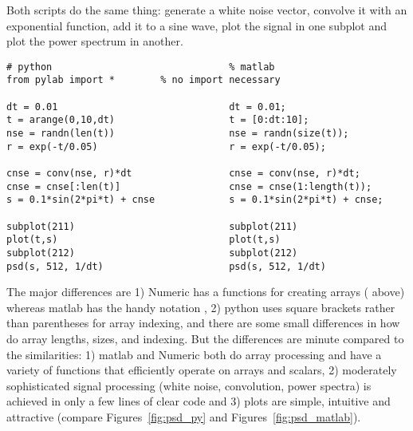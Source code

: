 \documentclass[twoside]{book}
\begin{document}

Both scripts do the same thing: generate a white noise vector,
convolve it with an exponential function, add it to a sine wave, plot
the signal in one subplot and plot the power spectrum in another.

\begin{lstlisting}[caption={matplotlib and matlab}, label=lst:versus_matlab]
# python                               % matlab
from pylab import *        % no import necessary

dt = 0.01                              dt = 0.01;
t = arange(0,10,dt)                    t = [0:dt:10];
nse = randn(len(t))                    nse = randn(size(t));
r = exp(-t/0.05)                       r = exp(-t/0.05);

cnse = conv(nse, r)*dt                 cnse = conv(nse, r)*dt;
cnse = cnse[:len(t)]                   cnse = cnse(1:length(t));
s = 0.1*sin(2*pi*t) + cnse             s = 0.1*sin(2*pi*t) + cnse;

subplot(211)                           subplot(211)
plot(t,s)                              plot(t,s)
subplot(212)                           subplot(212)
psd(s, 512, 1/dt)                      psd(s, 512, 1/dt)
\end{lstlisting}

The major differences are 1) Numeric has a functions for creating
arrays ( above) whereas matlab has the handy notation
\code{[0:dt:10]}, 2) python uses square brackets rather than
parentheses for array indexing, and there are some small differences
in how do array lengths, sizes, and indexing.  But the differences are
minute compared to the similarities: 1) matlab and Numeric both do
array processing and have a variety of functions that efficiently
operate on arrays and scalars, 2) moderately sophisticated signal
processing (white noise, convolution, power spectra) is achieved in
only a few lines of clear code and 3) plots are simple, intuitive and
attractive (compare Figures~\ref{fig:psd_py} and
Figures~\ref{fig:psd_matlab}).


\end{document}
